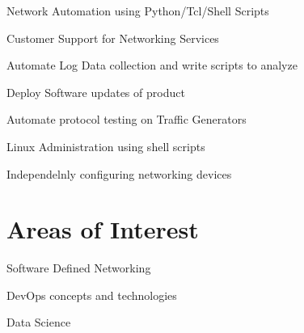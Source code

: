 \documentclass[letterpaper]{deedy-resume} %
\begin{document}
\begin{minipage}[t]{0.66\textwidth}
\sectionspace %
\sectionspace %

\sectionspace %
\begin{tightitemize}
\item Network Automation using Python/Tcl/Shell Scripts
\item Customer Support for Networking Services
\item Automate Log Data collection and write scripts to analyze
\item Deploy Software updates of product
\end{tightitemize}

\sectionspace %
\sectionspace %


\sectionspace %
\begin{tightitemize}

\item Automate protocol testing on Traffic Generators
\item Linux Administration using shell scripts 
\item Independelnly configuring networking devices
\end{tightitemize}

\sectionspace %
\sectionspace %

\section{Areas of Interest}
\sectionspace  %
\begin{tightitemize}
\item Software Defined Networking 
\item DevOps concepts and technologies
\item Data Science
\end{tightitemize}
\sectionspace %
\sectionspace %


\end{minipage}
\end{document}

